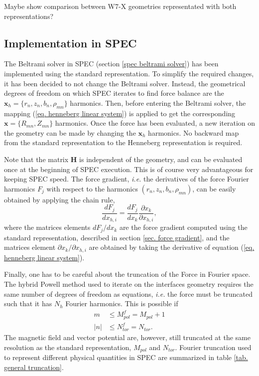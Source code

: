 \documentclass[my_thesis.tex]{subfiles}
\begin{document}
{\color{red} Maybe show comparison between W7-X geometries representated with both representations?}

\subsection{Implementation in SPEC}
The Beltrami solver in SPEC (section \ref{spec beltrami solver}) has been implemented using the standard representation. To simplify the required changes, it has been decided to not change the Beltrami solver. Instead, the geometrical degrees of freedom on which SPEC iterates to find force balance are the $\mathbf{x}_h=\{r_n,z_n,b_n,\rho_{mn}\}$ harmonics. Then, before entering the Beltrami solver, the mapping (\ref{eq. henneberg linear system}) is applied to get the corresponding $\mathbf{x}=\{R_{mn},Z_{mn}\}$ harmonics. Once the force has been evaluated, a new iteration on the geometry can be made by changing the $\mathbf{x}_h$ harmonics. No backward map from the standard representation to the Henneberg representation is required.

Note that the matrix $\mathbf{H}$ is independent of the geometry, and can be evaluated once at the beginning of SPEC execution. This is of course very advantageous for keeping SPEC speed. The force gradient, \textit{i.e.} the derivatives of the force Fourier harmonics $F_j$ with respect to the harmonics $(r_n,z_n,b_n,\rho_{mn})$, can be easily obtained by applying the chain rule,
\begin{equation}
	\frac{dF_j}{dx_{h,i}} = \frac{dF_j}{dx_k}\frac{\partial x_k}{\partial x_{h,i}},
\end{equation}
where the matrices elements $dF_j/dx_k$ are the force gradient computed using the standard representation, described in section \ref{sec. force gradient}, and the matrices element $\partial x_k/\partial x_{h,i}$ are obtained by taking the derivative of equation (\ref{eq. henneberg linear system}).

Finally, one has to be careful about the truncation of the Force in Fourier space. The hybrid Powell method used to iterate on the interfaces geometry requires the same number of degrees of freedom as equations, \textit{i.e.} the force must be truncated such that it has $N_h$ Fourier harmonics. This is possible if 
\begin{align}
	m&\leq M^f_{pol}= M_{pol}+1\label{eq.poloidal force truncation}\\ 
	|n|&\leq N^f_{tor}= N_{tor}.\label{eq.toroidal force truncation}
\end{align}
The magnetic field and vector potential are, however, still truncated at the same resolution as the standard representation, $M_{pol}$ and $N_{tor}$. Fourier truncation used to represent different physical quantities in SPEC are summarized in table \ref{tab. general truncation}.
\end{document}
